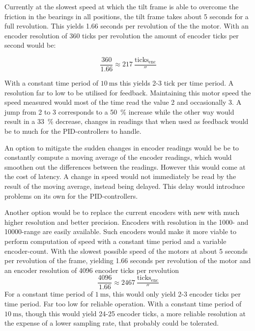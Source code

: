 \documentclass[../../main.tex]{subfiles}
\begin{document}
Currently at the slowest speed at which the tilt frame is able to overcome the friction in the bearings in all positions, the tilt frame takes about 5 seconds for a full revolution. This yields 1.66 seconds per revolution of the the motor. With an encoder resolution of 360 ticks per revolution the amount of encoder ticks per second would be: 

\begin{equation}
    \frac{360}{1.66} \approx \SI{ 217 }{ \frac{ \mathrm{ ticks_{enc} } }{ \second } }
\end{equation}

With a constant time period of $\SI{ 10 }{ \milli \second } $ this yields 2-3 tick per time period. A resolution far to low to be utilised for feedback. Maintaining this motor speed the speed measured would most of the time read the value 2 and occasionally 3. A jump from 2 to 3 corresponds to a \SI{50}{\percent} increase while the other way would result in a \SI{33}{\percent} decrease, changes in readings that when used as feedback would be to much for the PID-controllers to handle.

An option to mitigate the sudden changes in encoder readings would be be to constantly compute a moving average of the encoder readings, which would smoothen out the differences between the readings. However this would come at the cost of latency. A change in speed would not immediately be read by the result of the moving average, instead being delayed. This delay would introduce problems on its own for the PID-controllers. 

Another option would be to replace the current encoders with new with much higher resolution and better precision. Encoders with resolution in the 1000- and 10000-range are easily available. Such encoders would make it more viable to perform computation of speed with a constant time period and a variable encoder-count. With the slowest possible speed of the motors at about 5 seconds per revolution of the frame, yielding 1.66 seconds per revolution of the motor and an encoder resolution of 4096 encoder ticks per revolution 
\begin{equation}
    \frac{4096}{1.66} \approx \SI{ 2467 }{ \frac{ \mathrm{ ticks_{enc} } }{ \second } } 
\end{equation}
For a constant time period of $\SI{ 1 }{ \milli \second }$, this would only yield 2-3 encoder ticks per time period. Far too low for reliable operation. With a constant time period of $\SI{ 10 }{ \milli \second }$, though this would yield 24-25 encoder ticks, a more reliable resolution at the expense of a lower sampling rate, that probably could be tolerated.
\end{document}
